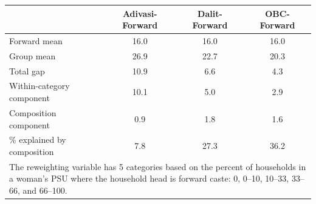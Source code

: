 \begin{tabular}{l*{3}{c}}
\hline\hline
            &\multicolumn{1}{c}{Adivasi-Forward}&\multicolumn{1}{c}{Dalit-Forward}&\multicolumn{1}{c}{OBC-Forward}\\
\hline
\hline
Forward mean&        16.0&        16.0&        16.0\\
Group mean  &        26.9&        22.7&        20.3\\
Total gap   &        10.9&         6.6&         4.3\\
Within-category component&        10.1&         5.0&         2.9\\
Composition component&         0.9&         1.8&         1.6\\
\% explained by composition&         7.8&        27.3&        36.2\\
\hline\hline
\multicolumn{4}{l}{\footnotesize \parbox[t]{0.95\linewidth}{The reweighting variable has 5 categories based on the percent of households in a woman's PSU where the household head is forward caste: 0, 0--10, 10--33, 33--66, and 66--100.}}\\
\end{tabular}

